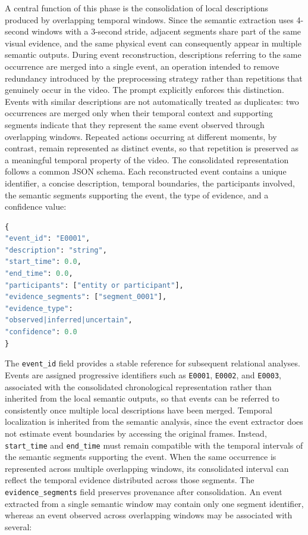 A central function of this phase is the consolidation of local descriptions produced by overlapping temporal windows. Since the semantic extraction uses 4-second windows with a 3-second stride, adjacent segments share part of the same visual evidence, and the same physical event can consequently appear in multiple semantic outputs. During event reconstruction, descriptions referring to the same occurrence are merged into a single event, an operation intended to remove redundancy introduced by the preprocessing strategy rather than repetitions that genuinely occur in the video.
The prompt explicitly enforces this distinction. Events with similar descriptions are not automatically treated as duplicates: two occurrences are merged only when their temporal context and supporting segments indicate that they represent the same event observed through overlapping windows. Repeated actions occurring at different moments, by contrast, remain represented as distinct events, so that repetition is preserved as a meaningful temporal property of the video.
The consolidated representation follows a common JSON schema. Each reconstructed event contains a unique identifier, a concise description, temporal boundaries, the participants involved, the semantic segments supporting the event, the type of evidence, and a confidence value:
\begin{lstlisting}[language=Python]
{
"event_id": "E0001",
"description": "string",
"start_time": 0.0,
"end_time": 0.0,
"participants": ["entity or participant"],
"evidence_segments": ["segment_0001"],
"evidence_type":
"observed|inferred|uncertain",
"confidence": 0.0
}
\end{lstlisting}
The \texttt{event\_id} field provides a stable reference for subsequent relational analyses. Events are assigned progressive identifiers such as \texttt{E0001}, \texttt{E0002}, and \texttt{E0003}, associated with the consolidated chronological representation rather than inherited from the local semantic outputs, so that events can be referred to consistently once multiple local descriptions have been merged.
Temporal localization is inherited from the semantic analysis, since the event extractor does not estimate event boundaries by accessing the original frames. Instead, \texttt{start\_time} and \texttt{end\_time} must remain compatible with the temporal intervals of the semantic segments supporting the event. When the same occurrence is represented across multiple overlapping windows, its consolidated interval can reflect the temporal evidence distributed across those segments.
The \texttt{evidence\_segments} field preserves provenance after consolidation. An event extracted from a single semantic window may contain only one segment identifier, whereas an event observed across overlapping windows may be associated with several:
